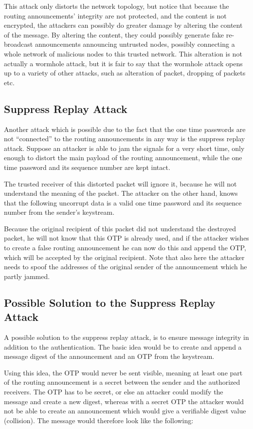 This attack only distorts the network topology, but notice that because the
routing announcements' integrity are not protected, and the content is not
encrypted, the attackers can possibly do greater damage by altering the content
of the message. By altering the content, they could possibly generate fake
re-broadcast announcements announcing untrusted nodes, possibly connecting a
whole network of malicious nodes to this trusted network. This alteration is
not actually a wormhole attack, but it is fair to say that the wormhole attack
opens up to a variety of other attacks, such as alteration of packet, dropping
of packets etc.

\subsection{Suppress Replay Attack}
Another attack which is possible due to the fact that the one time passwords are
not ``connected'' to the routing announcements in any way is the suppress replay
attack. Suppose an attacker is able to jam the signals for a very short time,
only enough to distort the main payload of the routing announcement, while the
one time password and its sequence number are kept intact.

The trusted receiver of this distorted packet will ignore it, because he will
not understand the meaning of the packet. The attacker on the other hand, knows
that the following uncorrupt data is a valid one time password and its sequence
number from the sender's keystream.

Because the original recipient of this packet did not understand the destroyed
packet, he will not know that this \ac{OTP} is already used, and if the attacker
wishes to create a false routing announcement he can now do this and append the
\ac{OTP}, which will be accepted by the original recipient. Note that also here
the attacker needs to spoof the addresses of the original sender of the
announcement which he partly jammed.

\subsection{Possible Solution to the Suppress Replay Attack}
A possible solution to the suppress replay attack, is to ensure message
integrity in addition to the authentication. The basic idea would be to create
and append a message digest of the announcement and an OTP from the keystream.

Using this idea, the OTP would never be sent visible, meaning at least one part
of the routing announcement is a secret between the sender and the authorized
receivers. The OTP has to be secret, or else an attacker could modify the
message and create a new digest, whereas with a secret OTP the attacker would
not be able to create an announcement which would give a verifiable digest value
(collision). The message would therefore look like the following:

